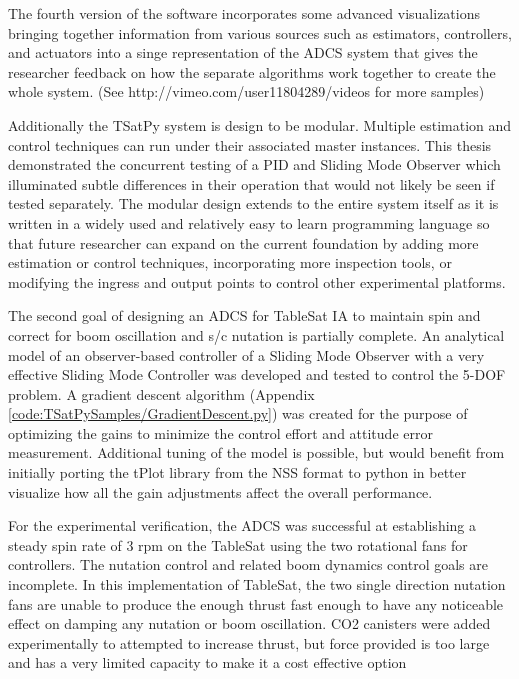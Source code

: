 The fourth version of the software incorporates some advanced visualizations bringing together information from various sources such as estimators, controllers, and actuators into a singe representation of the ADCS system that gives the researcher feedback on how the separate algorithms work together to create the whole system. (See http://vimeo.com/user11804289/videos for more samples)

Additionally the TSatPy system is design to be modular.  Multiple estimation and control techniques can run under their associated master instances.  This thesis demonstrated the concurrent testing of a PID and Sliding Mode Observer which illuminated subtle differences in their operation that would not likely be seen if tested separately.  The modular design extends to the entire system itself as it is written in a widely used and relatively easy to learn programming language so that future researcher can expand on the current foundation by adding more estimation or control techniques, incorporating more inspection tools, or modifying the ingress and output points to control other experimental platforms.

The second goal of designing an ADCS for TableSat IA to maintain spin and correct for boom oscillation and s/c nutation is partially complete.  An analytical model of an observer-based controller of a Sliding Mode Observer with a very effective Sliding Mode Controller was developed and tested to control the 5-DOF problem.  A gradient descent algorithm (Appendix \ref{code:TSatPySamples/GradientDescent.py}) was created for the purpose of optimizing the gains to minimize the control effort and attitude error measurement.   Additional tuning of the model is possible, but would benefit from initially porting the tPlot library from the NSS format to python in better visualize how all the gain adjustments affect the overall performance.

For the experimental verification, the ADCS was successful at establishing a steady spin rate of 3 rpm on the TableSat using the two rotational fans for controllers.  The nutation control and related boom dynamics control goals are incomplete.  In this implementation of TableSat, the two single direction nutation fans are unable to produce the enough thrust fast enough to have any noticeable effect on damping any nutation or boom oscillation.  CO2 canisters were added experimentally to attempted to increase thrust, but force provided is too large and has a very limited capacity to make it a cost effective option

